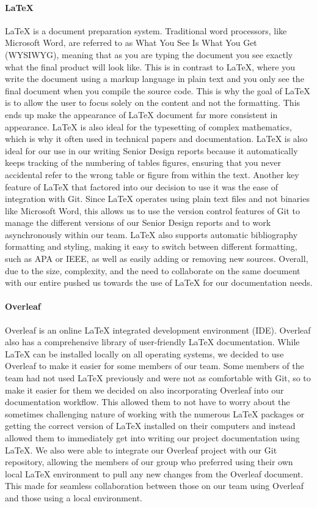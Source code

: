 \paragraph{LaTeX}
LaTeX is a document preparation system. Traditional word processors, like Microsoft Word, are referred to as What You See Is What You Get (WYSIWYG), meaning that as you are typing the document you see exactly what the final product will look like. This is in contrast to LaTeX, where you write the document using a markup language in plain text and you only see the final document when you compile the source code. This is why the goal of LaTeX is to allow the user to focus solely on the content and not the formatting. This ends up make the appearance of LaTeX document far more consistent in appearance. LaTeX is also ideal for the typesetting of complex mathematics, which is why it often used in technical papers and documentation. LaTeX is also ideal for our use in our writing Senior Design reports because it automatically keeps tracking of the numbering of tables figures, ensuring that you never accidental refer to the wrong table or figure from within the text. Another key feature of LaTeX that factored into our decision to use it was the ease of integration with Git. Since LaTeX operates using plain text files and not binaries like Microsoft Word, this allows us to use the version control features of Git to manage the different versions of our Senior Design reports and to work asynchronously within our team. LaTeX also supports automatic bibliography formatting and styling, making it easy to switch between different formatting, such as APA or IEEE, as well as easily adding or removing new sources. Overall, due to the size, complexity, and the need to collaborate on the same document with our entire pushed us towards the use of LaTeX for our documentation needs.

\paragraph{Overleaf}
Overleaf is an online LaTeX integrated development environment (IDE). Overleaf also has a comprehensive library of user-friendly LaTeX documentation. While LaTeX can be installed locally on all operating systems, we decided to use Overleaf to make it easier for some members of our team. Some members of the team had not used LaTeX previously and were not as comfortable with Git, so to make it easier for them we decided on also incorporating Overleaf into our documentation workflow. This allowed them to not have to worry about the sometimes challenging nature of working with the numerous LaTeX packages or getting the correct version of LaTeX installed on their computers and instead allowed them to immediately get into writing our project documentation using LaTeX. We also were able to integrate our Overleaf project with our Git repository, allowing the members of our group who preferred using their own local LaTeX environment to pull any new changes from the Overleaf document. This made for seamless collaboration between those on our team using Overleaf and those using a local environment.

